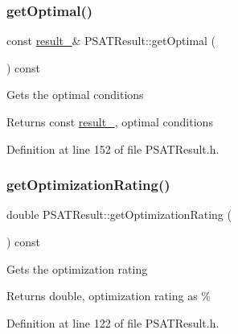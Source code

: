 \subsubsection{\texorpdfstring{get\+Optimal()}{getOptimal()}\hspace{0.1cm}{\footnotesize\ttfamily [3/3]}}
{\footnotesize\ttfamily const \hyperlink{struct_p_s_a_t_result_1_1result__}{result\+\_\+}\& P\+S\+A\+T\+Result\+::get\+Optimal (\begin{DoxyParamCaption}{ }\end{DoxyParamCaption}) const\hspace{0.3cm}{\ttfamily [inline]}}

Gets the optimal conditions

\begin{DoxyReturn}{Returns}
const \hyperlink{struct_p_s_a_t_result_1_1result__}{result\+\_\+}, optimal conditions 
\end{DoxyReturn}


Definition at line 152 of file P\+S\+A\+T\+Result.\+h.

\mbox{\label{class_p_s_a_t_result_aa0a7001461408fcb06a6c22ce2d064db}} 
\subsubsection{\texorpdfstring{get\+Optimization\+Rating()}{getOptimizationRating()}\hspace{0.1cm}{\footnotesize\ttfamily [1/3]}}
{\footnotesize\ttfamily double P\+S\+A\+T\+Result\+::get\+Optimization\+Rating (\begin{DoxyParamCaption}{ }\end{DoxyParamCaption}) const\hspace{0.3cm}{\ttfamily [inline]}}

Gets the optimization rating

\begin{DoxyReturn}{Returns}
double, optimization rating as \% 
\end{DoxyReturn}


Definition at line 122 of file P\+S\+A\+T\+Result.\+h.

\mbox{\label{class_p_s_a_t_result_aa0a7001461408fcb06a6c22ce2d064db}} 
